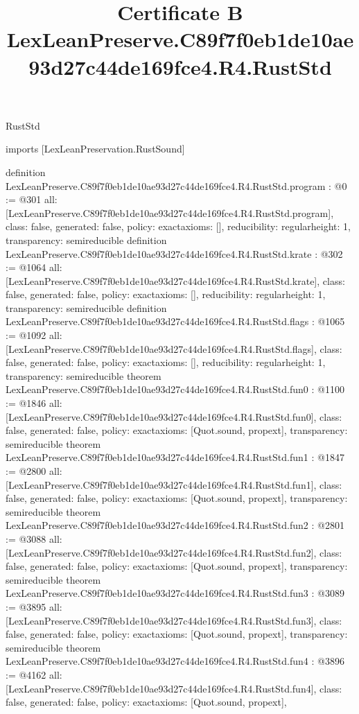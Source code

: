 \begin{lexlean}{RustStd}
\title{Certificate B LexLeanPreserve.C89f7f0eb1de10ae93d27c44de169fce4.R4.RustStd}
\begin{coremodule}
imports [LexLeanPreservation.RustSound]

definition LexLeanPreserve.C89f7f0eb1de10ae93d27c44de169fce4.R4.RustStd.program : @0 := @301 {
  all: [LexLeanPreserve.C89f7f0eb1de10ae93d27c44de169fce4.R4.RustStd.program],
  class: false,
  generated: false,
  policy: exact{axioms: []},
  reducibility: regular{height: 1},
  transparency: semireducible
}
definition LexLeanPreserve.C89f7f0eb1de10ae93d27c44de169fce4.R4.RustStd.krate : @302 := @1064 {
  all: [LexLeanPreserve.C89f7f0eb1de10ae93d27c44de169fce4.R4.RustStd.krate],
  class: false,
  generated: false,
  policy: exact{axioms: []},
  reducibility: regular{height: 1},
  transparency: semireducible
}
definition LexLeanPreserve.C89f7f0eb1de10ae93d27c44de169fce4.R4.RustStd.flags : @1065 := @1092 {
  all: [LexLeanPreserve.C89f7f0eb1de10ae93d27c44de169fce4.R4.RustStd.flags],
  class: false,
  generated: false,
  policy: exact{axioms: []},
  reducibility: regular{height: 1},
  transparency: semireducible
}
theorem LexLeanPreserve.C89f7f0eb1de10ae93d27c44de169fce4.R4.RustStd.fun0 : @1100 := @1846 {
  all: [LexLeanPreserve.C89f7f0eb1de10ae93d27c44de169fce4.R4.RustStd.fun0],
  class: false,
  generated: false,
  policy: exact{axioms: [Quot.sound, propext]},
  transparency: semireducible
}
theorem LexLeanPreserve.C89f7f0eb1de10ae93d27c44de169fce4.R4.RustStd.fun1 : @1847 := @2800 {
  all: [LexLeanPreserve.C89f7f0eb1de10ae93d27c44de169fce4.R4.RustStd.fun1],
  class: false,
  generated: false,
  policy: exact{axioms: [Quot.sound, propext]},
  transparency: semireducible
}
theorem LexLeanPreserve.C89f7f0eb1de10ae93d27c44de169fce4.R4.RustStd.fun2 : @2801 := @3088 {
  all: [LexLeanPreserve.C89f7f0eb1de10ae93d27c44de169fce4.R4.RustStd.fun2],
  class: false,
  generated: false,
  policy: exact{axioms: [Quot.sound, propext]},
  transparency: semireducible
}
theorem LexLeanPreserve.C89f7f0eb1de10ae93d27c44de169fce4.R4.RustStd.fun3 : @3089 := @3895 {
  all: [LexLeanPreserve.C89f7f0eb1de10ae93d27c44de169fce4.R4.RustStd.fun3],
  class: false,
  generated: false,
  policy: exact{axioms: [Quot.sound, propext]},
  transparency: semireducible
}
theorem LexLeanPreserve.C89f7f0eb1de10ae93d27c44de169fce4.R4.RustStd.fun4 : @3896 := @4162 {
  all: [LexLeanPreserve.C89f7f0eb1de10ae93d27c44de169fce4.R4.RustStd.fun4],
  class: false,
  generated: false,
  policy: exact{axioms: [Quot.sound, propext]},
}
\end{coremodule}
\end{lexlean}

